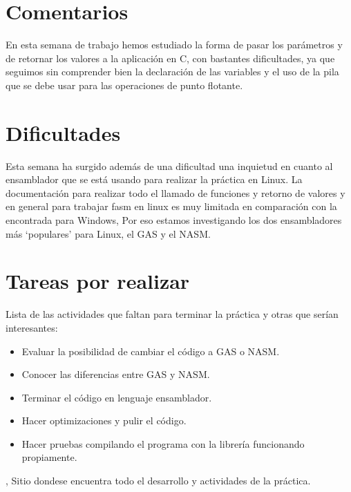 \documentclass[%
	final,
	notitlepage,
	narroweqnarray,
	inline,
	twoside,
	]{ieee}
\begin{document}
\section{Comentarios}

\PARstart En esta semana de trabajo hemos estudiado
la forma de pasar los parámetros y de retornar los valores
a la aplicación en C, con bastantes dificultades, ya que
seguimos sin comprender bien la declaración de las
variables y el uso de la pila que se debe usar para las
operaciones de punto flotante.

\section{Dificultades}

Esta semana ha surgido además de una dificultad una
inquietud en cuanto al ensamblador que se está usando
para realizar la práctica en Linux.
La documentación para realizar todo el llamado de funciones
y retorno de valores y en general para trabajar fasm en linux
es muy limitada en comparación con la encontrada
para Windows, Por eso estamos investigando  los dos
ensambladores más `populares' para Linux, el GAS y el NASM.
\\ 
\section{Tareas por realizar}

Lista de las actividades que faltan para terminar la práctica y
otras que serían interesantes:
\begin{itemize}
\item Evaluar la posibilidad de cambiar el código a GAS o NASM.
\item Conocer las diferencias entre GAS y NASM.
\item Terminar el código en lenguaje ensamblador.
\item Hacer optimizaciones y pulir el código.
\item Hacer pruebas compilando el programa con 
la librería funcionando propiamente.
\end{itemize}



\begin{thebibliography}{1}

,
\newblock Sitio dondese encuentra todo el desarrollo y actividades de la práctica.

\end{thebibliography}

\end{document}
